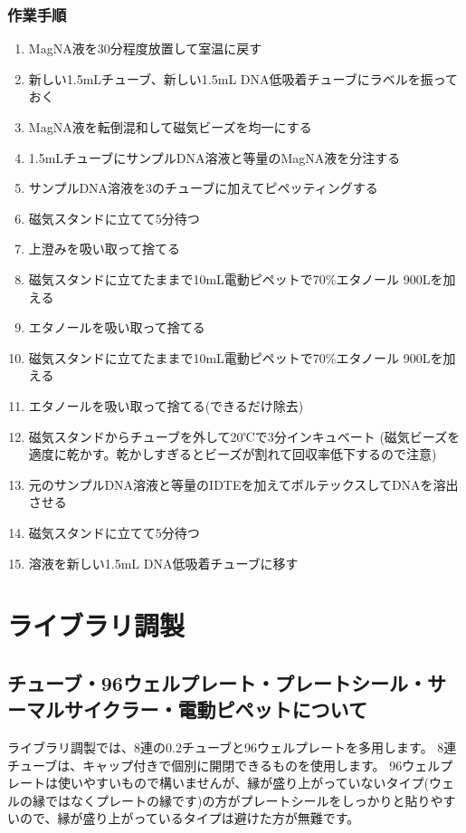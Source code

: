 \documentclass[titlepage,10pt,a4paper]{jsbook}
\begin{document}
\subsubsection{作業手順}
\begin{enumerate}
\item MagNA液を30分程度放置して室温に戻す
\item 新しい1.5mLチューブ、新しい1.5mL DNA低吸着チューブにラベルを振っておく
\item MagNA液を転倒混和して磁気ビーズを均一にする
\item 1.5mLチューブにサンプルDNA溶液と等量のMagNA液を分注する
\item サンプルDNA溶液を3のチューブに加えてピペッティングする
\item 磁気スタンドに立てて5分待つ
\item 上澄みを吸い取って捨てる
\item 磁気スタンドに立てたままで10mL電動ピペットで70\%エタノール 900{\textmu}Lを加える
\item エタノールを吸い取って捨てる
\item 磁気スタンドに立てたままで10mL電動ピペットで70\%エタノール 900{\textmu}Lを加える
\item エタノールを吸い取って捨てる(できるだけ除去)
\item 磁気スタンドからチューブを外して20℃で3分インキュベート (磁気ビーズを適度に乾かす。乾かしすぎるとビーズが割れて回収率低下するので注意)
\item 元のサンプルDNA溶液と等量のIDTEを加えてボルテックスしてDNAを溶出させる
\item 磁気スタンドに立てて5分待つ
\item 溶液を新しい1.5mL DNA低吸着チューブに移す
\end{enumerate}

\section{ライブラリ調製}

\subsection{チューブ・96ウェルプレート・プレートシール・サーマルサイクラー・電動ピペットについて}

ライブラリ調製では、8連の0.2チューブと96ウェルプレートを多用します。
8連チューブは、キャップ付きで個別に開閉できるものを使用します。
96ウェルプレートは使いやすいもので構いませんが、縁が盛り上がっていないタイプ(ウェルの縁ではなくプレートの縁です)の方がプレートシールをしっかりと貼りやすいので、縁が盛り上がっているタイプは避けた方が無難です。
\end{document}
